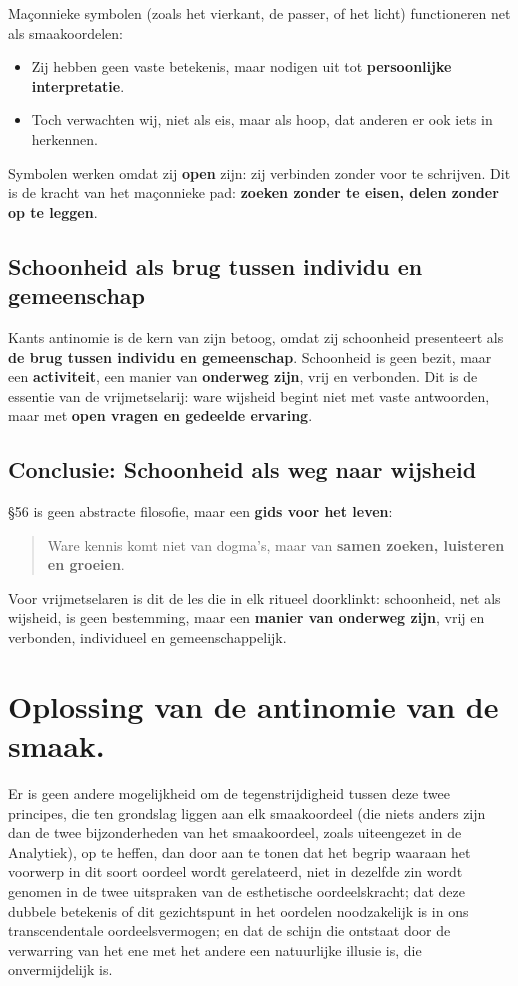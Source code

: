 \begin{mdframed}[leftmargin=0pt,rightmargin=0pt,backgroundcolor=blue!6,linecolor=white,innertopmargin=6pt,innerbottommargin=6pt]
Maçonnieke symbolen (zoals het vierkant, de passer, of het licht) functioneren net als smaakoordelen:
\begin{itemize}
    \item Zij hebben geen vaste betekenis, maar nodigen uit tot \textbf{persoonlijke interpretatie}.
    \item Toch verwachten wij, niet als eis, maar als hoop, dat anderen er ook iets in herkennen.
\end{itemize}
Symbolen werken omdat zij \textbf{open} zijn: zij verbinden zonder voor te schrijven. Dit is de kracht van het maçonnieke pad: \textbf{zoeken zonder te eisen, delen zonder op te leggen}.

\subsection*{Schoonheid als brug tussen individu en gemeenschap}

Kants antinomie is de kern van zijn betoog, omdat zij schoonheid presenteert als \textbf{de brug tussen individu en gemeenschap}. Schoonheid is geen bezit, maar een \textbf{activiteit}, een manier van \textbf{onderweg zijn}, vrij en verbonden. Dit is de essentie van de vrijmetselarij: ware wijsheid begint niet met vaste antwoorden, maar met \textbf{open vragen en gedeelde ervaring}.

\subsection*{Conclusie: Schoonheid als weg naar wijsheid}

§56 is geen abstracte filosofie, maar een \textbf{gids voor het leven}:
\begin{quote}
Ware kennis komt niet van dogma's, maar van \textbf{samen zoeken, luisteren en groeien}.
\end{quote}
Voor vrijmetselaren is dit de les die in elk ritueel doorklinkt: schoonheid, net als wijsheid, is geen bestemming, maar een \textbf{manier van onderweg zijn}, vrij en verbonden, individueel en gemeenschappelijk.

\end{mdframed}

\section{Oplossing van de antinomie van de smaak.}

Er is geen andere mogelijkheid om de tegenstrijdigheid tussen deze twee principes, die ten grondslag liggen aan elk smaakoordeel (die niets anders zijn dan de twee bijzonderheden van het smaakoordeel, zoals uiteengezet in de Analytiek), op te heffen, dan door aan te tonen dat het begrip waaraan het voorwerp in dit soort oordeel wordt gerelateerd, niet in dezelfde zin wordt genomen in de twee uitspraken van de esthetische oordeelskracht; dat deze dubbele betekenis of dit gezichtspunt in het oordelen noodzakelijk is in ons transcendentale oordeelsvermogen; en dat de schijn die ontstaat door de verwarring van het ene met het andere een natuurlijke illusie is, die onvermijdelijk is.

